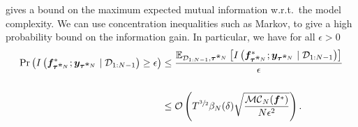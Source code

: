  gives a bound on the maximum expected mutual information w.r.t.~the model complexity. We can use concentration inequalities such as Markov, to give a high probability bound on the information gain. In particular, we have for all $\epsilon > 0$
\begin{align*}
     \Pr \left(I\left({\bm{f}}^*_{{\bm{\tau}}^{\bar{{\bm{\pi}}}_N}}; {\bm{y}}_{{\bm{\tau}}^{\bar{{\bm{\pi}}}_N}} \mid {\mathcal{D}}_{1:N-1}\right)  \geq \epsilon \right) &\leq  \frac{ \mathbb{E}_{{\mathcal{D}}_{1:N-1}, {\bm{\tau}}^{\bar{{\bm{\pi}}}_N}}\left[I\left({\bm{f}}^*_{{\bm{\tau}}^{\bar{{\bm{\pi}}}_N}}; {\bm{y}}_{{\bm{\tau}}^{\bar{{\bm{\pi}}}_N}} \mid {\mathcal{D}}_{1:N-1}\right)\right]}{\epsilon} \\
    \\ &\leq  {\mathcal{O}} \left(T^{\sfrac{3}{2}}\beta_{N}(\delta) \sqrt{\frac{{{\mathcal{M}}{\mathcal{C}}}_N({\bm{f}}^*)}{N\epsilon^2}}\right).
\end{align*}

